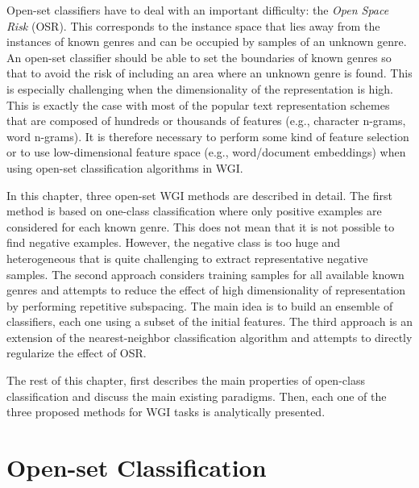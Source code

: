 Open-set classifiers have to deal with an important difficulty: the \textit{Open Space Risk} (OSR). This corresponds to the instance space that lies away from the instances of known genres and can be occupied by samples of an unknown genre. An open-set classifier should be able to set the boundaries of known genres so that to avoid the risk of including an area where an unknown genre is found. This is especially challenging when the dimensionality of the representation is high. This is exactly the case with most of the popular text representation schemes that are composed of hundreds or thousands of features (e.g., character n-grams, word n-grams). It is therefore necessary to perform some kind of feature selection or to use low-dimensional feature space (e.g., word/document embeddings) when using open-set classification algorithms in WGI. 

In this chapter, three open-set WGI methods are described in detail. The first method is based on one-class classification where only positive examples are considered for each known genre. This does not mean that it is not possible to find negative examples. However, the negative class is too huge and heterogeneous that is quite challenging to extract representative negative samples. The second approach considers training samples for all available known genres and attempts to reduce the effect of high dimensionality of representation by performing repetitive subspacing. The main idea is to build an ensemble of classifiers, each one using a subset of the initial features. The third approach is an extension of the nearest-neighbor classification algorithm and attempts to directly regularize the effect of OSR.


The rest of this chapter, first describes the main properties of open-class classification and discuss the main existing paradigms. Then, each one of the three proposed methods for WGI tasks is analytically presented. 

\section{Open-set Classification}

